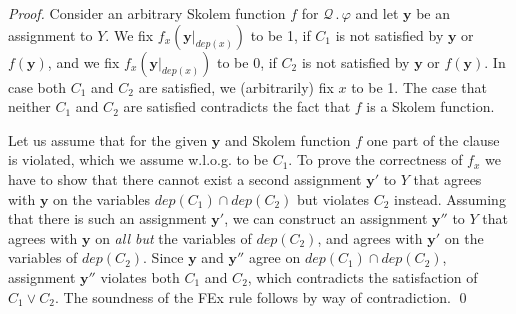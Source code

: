 \documentclass{svjour3}
\newcommand{\ldot}{\mathpunct{.}}
\newcommand{\dep}{\mathit{dep}}
\newcommand{\ass}[1]{\mathbf{#1}}
\begin{document}
\begin{proof}
Consider an arbitrary Skolem function $f$ for $\mathcal Q\ldot\varphi$ and let $\ass y$ be an assignment to $Y$.
We fix $f_x(\ass y|_{\dep(x)})$ to be 1, if $C_1$ is not satisfied by $\ass y$ or $f(\ass y)$, and we fix $f_x(\ass y|_{\dep(x)})$ to be 0, if $C_2$ is not satisfied by $\ass y$ or $f(\ass y)$. 
In case both $C_1$ and $C_2$ are satisfied, we (arbitrarily) fix $x$ to be 1. 
The case that neither $C_1$ and $C_2$ are satisfied contradicts the fact that $f$ is a Skolem function. %

Let us assume that for the given $\ass y$ and Skolem function $f$ one part of the clause is violated, which we assume w.l.o.g. to be $C_1$. 
To prove the correctness of $f_x$ we have to show that there cannot exist a second assignment $\ass y'$ to $Y$ that agrees with $\ass y$ on the variables $\dep(C_1)\cap\dep(C_2)$ but violates $C_2$ instead. 
Assuming that there is such an assignment $\ass y'$, we can construct an assignment $\ass y''$ to $Y$ that agrees with $\ass y$ on \emph{all but} the variables of $\dep(C_2)$, and agrees with $\ass y'$ on the variables of $\dep(C_2)$. 
Since $\ass y$ and $\ass y''$ agree on $\dep(C_1)\cap\dep(C_2)$, assignment $\ass y''$ violates both $C_1$ and $C_2$, which contradicts the satisfaction of $C_1 \vee C_2$. 
%
%
The soundness of the {\sf FEx} rule follows by way of contradiction.
\qed
\end{proof}
\end{document}
